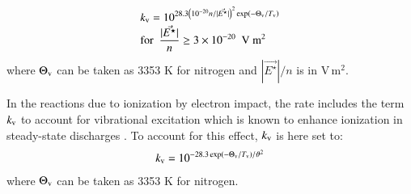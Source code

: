 \documentclass{warpdoc}
\newcommand{\mfd}{\displaystyle}
\begin{document}
%
\begin{equation}
 \begin{array}{l}
\mfd  k_{\rm v}= 10^{28.3 \left(10^{-20}{ n }/{|\vec{E^\star}|}\right)^2 \exp\left(-{\Theta_{\rm v}}/{T_{\rm v}}\right) }\\
\mfd{\rm for~~}\frac{|\vec{E^\star}|}{n} \geq 3 \times 10^{-20} {\rm ~~V~m^2}
\end{array}
\end{equation}
%
where $\Theta_{\rm v}$ can be taken as 3353 K for nitrogen and $|\vec{E^\star}|/n$ is in V\,m$^2$. 




       In the reactions due to ionization by electron impact,
the rate includes the term $k_{\rm v}$ to account for vibrational excitation which is known to enhance ionization in steady-state discharges \cite{book:1987:mnatsakanyan,misc:1978:aleksandrov,misc:1978:son}. To account for this effect, $k_{\rm v}$ is here set to:\cite{book:1987:mnatsakanyan,misc:1978:aleksandrov,misc:1978:son}
%
\begin{equation}
 \begin{array}{l}
\mfd  k_{\rm v}= 10^{-28.3  \exp\left(-{\Theta_{\rm v}}/{T_{\rm v}}\right)/\vartheta^2 }
\end{array}
\end{equation}
%
where $\Theta_{\rm v}$ can be taken as 3353 K for nitrogen.





\end{document}
